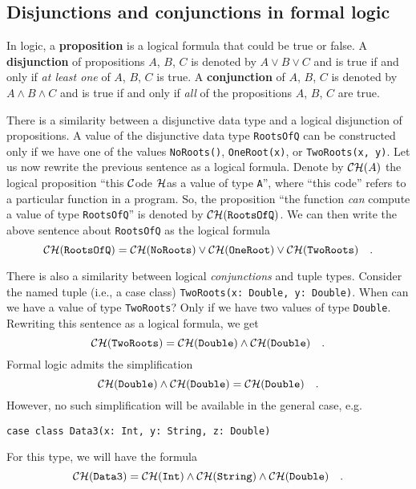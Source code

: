 \subsection{Disjunctions and conjunctions in formal logic\label{subsec:Disjunctions-and-conjunctions}}

In logic, a \textbf{proposition} is
a logical formula that could be true or false. A \textbf{disjunction}
of propositions $A$, $B$, $C$ is denoted by $A\vee B\vee C$ and
is true if and only if \emph{at least one} of $A$, $B$, $C$ is
true. A \textbf{conjunction} of $A$,
$B$, $C$ is denoted by $A\wedge B\wedge C$ and is true if and only
if \emph{all} of the propositions $A$, $B$, $C$ are true.

There is a similarity between a disjunctive data type and a logical
disjunction of propositions. A value of the disjunctive data type
\lstinline!RootsOfQ! can be constructed only if we have one of the
values \lstinline!NoRoots()!, \lstinline!OneRoot(x)!, or \lstinline!TwoRoots(x, y)!.
Let us now rewrite the previous sentence as a logical formula. Denote
by ${\cal CH}(A)$ the logical proposition ``this ${\cal C}$ode
${\cal H}$as a value of type \lstinline!A!'', where ``this code''
refers to a particular function in a program. So, the proposition
``the function \emph{can} compute a value of type \lstinline!RootsOfQ!''
is denoted by ${\cal CH}(\text{\texttt{RootsOfQ}})$. We can then
write the above sentence about \lstinline!RootsOfQ! as the logical
formula
\begin{equation}
{\cal CH}(\text{\texttt{RootsOfQ}})={\cal CH}(\text{\texttt{NoRoots}})\vee{\cal CH}(\text{\texttt{OneRoot}})\vee{\cal CH}(\text{\texttt{TwoRoots}})\quad.\label{eq:curry-howard-example-disjunction}
\end{equation}

There is also a similarity between logical \emph{conjunctions} and
tuple types. Consider the named tuple (i.e., a case class) \lstinline!TwoRoots(x: Double, y: Double)!.
When can we have a value of type \lstinline!TwoRoots!? Only if we
have two values of type \lstinline!Double!. Rewriting this sentence
as a logical formula, we get
\[
{\cal CH}(\text{\texttt{TwoRoots}})={\cal CH}(\text{\texttt{Double}})\wedge{\cal CH}(\text{\texttt{Double}})\quad.
\]
Formal logic admits the simplification
\[
{\cal CH}(\text{\texttt{Double}})\wedge{\cal CH}(\text{\texttt{Double}})={\cal CH}(\text{\texttt{Double}})\quad.
\]
However, no such simplification will be available in the general case,
e.g.
\begin{lstlisting}
case class Data3(x: Int, y: String, z: Double)
\end{lstlisting}
For this type, we will have the formula 
\begin{equation}
{\cal CH}(\text{\texttt{Data3}})={\cal CH}(\text{\texttt{Int}})\wedge{\cal CH}(\text{\texttt{String}})\wedge{\cal CH}(\text{\texttt{Double}})\quad.\label{eq:curry-howard-example-case-class}
\end{equation}


